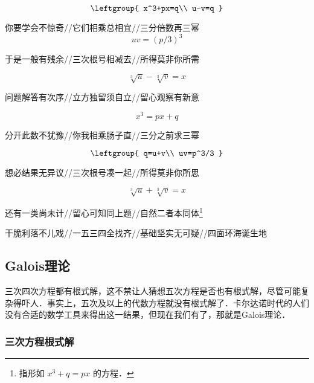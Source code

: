 \begin{equation}
\leftgroup{
    x^3+px=q\\
    u-v=q
}
\end{equation}

你要学会不惊奇//它们相乘总相宜//三分倍数再三幂
\begin{equation}
uv=(p/3)^3
\end{equation}

于是一般有残余//三次根号相减去//所得莫非你所需

\begin{equation}
\sqrt[3]{u}-\sqrt[3]{v}=x
\end{equation}


问题解答有次序//立方独留须自立//留心观察有新意

\begin{equation}
x^3=px+q
\end{equation}

分开此数不犹豫//你我相乘肠子直//三分之前求三幂

\begin{equation}
\leftgroup{
    q=u+v\\
    uv=p^3/3
}
\end{equation}

想必结果无异议//三次根号凑一起//所得莫非你所思

\begin{equation}
\sqrt[3]{u}+\sqrt[3]{v}=x
\end{equation}


还有一类尚未计//留心可知同上题//自然二者本同体\footnote{指形如
$
x^3+q=px
$
的方程．}


干脆利落不儿戏//一五三四全找齐//基础坚实无可疑//四面环海诞生地






\subsection{Galois理论}\label{PlyRtS_sub1}

三次四次方程都有根式解，这不禁让人猜想五次方程是否也有根式解，尽管可能复杂得吓人．事实上，五次及以上的代数方程就没有根式解了．卡尔达诺时代的人们没有合适的数学工具来得出这一结果，但现在我们有了，那就是Galois理论．








\subsubsection{三次方程根式解}

